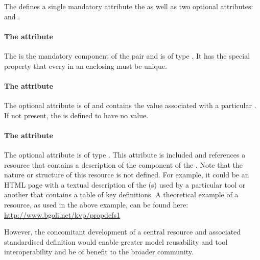 The \KeyValuePair defines a single mandatory attribute the  as well as two optional attributes:  and .

\paragraph{The  attribute}
The  is the mandatory component of the \KeyValuePair pair and is of type . It has the special property that every  in an enclosing \ListOfKeyValuePairs must be unique.

\paragraph{The  attribute}
The optional  attribute is of  and contains the value associated with a particular . If not present, the \KeyValuePair is defined to have no value.

\paragraph{The  attribute}
The optional attribute  is of type . This attribute is included and references a resource that contains a description of the  component of the \KeyValuePair. Note that the nature or structure of this resource is not defined. For example, it could be an HTML page with a textual description of the (s) used by a particular tool or another that contains a table of key definitions. A theoretical example of a resource, as used in the above example, can be found here: \url{http://www.bgoli.net/kvp/propdefs1}

However, the concomitant development of a central  resource and associated standardised  definition would enable greater model reusability and tool interoperability and be of benefit to the broader \SBML community.




